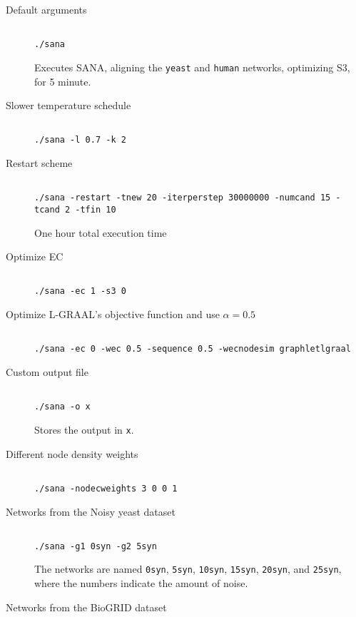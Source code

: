 \documentclass[]{article}
\begin{document}
\begin{description}
\item[Default arguments]
\begin{verbatim}

./sana
\end{verbatim}
Executes SANA, aligning the \texttt{yeast} and \texttt{human} networks, optimizing S3, for 5 minute.
\item[Slower temperature schedule]
\begin{verbatim}

./sana -l 0.7 -k 2
\end{verbatim}
\item[Restart scheme]
\begin{verbatim}

./sana -restart -tnew 20 -iterperstep 30000000 -numcand 15 -tcand 2 -tfin 10
\end{verbatim}
One hour total execution time
\item[Optimize EC]
\begin{verbatim}

./sana -ec 1 -s3 0
\end{verbatim}
\item[Optimize L-GRAAL's objective function and use $\alpha=0.5$]
\begin{verbatim}

./sana -ec 0 -wec 0.5 -sequence 0.5 -wecnodesim graphletlgraal
\end{verbatim}
\item[Custom output file]
\begin{verbatim}

./sana -o x
\end{verbatim}
Stores the output in \texttt{x}.
\item[Different node density weights]
\begin{verbatim}

./sana -nodecweights 3 0 0 1
\end{verbatim}
\item[Networks from the Noisy yeast dataset]
\begin{verbatim}

./sana -g1 0syn -g2 5syn
\end{verbatim}
The networks are named \texttt{0syn}, \texttt{5syn}, \texttt{10syn}, \texttt{15syn}, \texttt{20syn}, and \texttt{25syn}, where the numbers indicate the amount of noise.
\item[Networks from the BioGRID dataset]
\begin{verbatim}


\end{verbatim}
\end{description}
\end{document}
